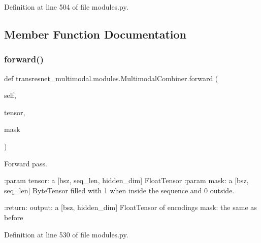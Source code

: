 Definition at line 504 of file modules.\+py.



\subsection{Member Function Documentation}
\mbox{\label{classtransresnet__multimodal_1_1modules_1_1MultimodalCombiner_a6967efeaad96c86a9993b959a3c7c713}} 
\subsubsection{\texorpdfstring{forward()}{forward()}}
{\footnotesize\ttfamily def transresnet\+\_\+multimodal.\+modules.\+Multimodal\+Combiner.\+forward (\begin{DoxyParamCaption}\item[{}]{self,  }\item[{}]{tensor,  }\item[{}]{mask }\end{DoxyParamCaption})}

\begin{DoxyVerb}Forward pass.

:param tensor:
    a [bsz, seq_len, hidden_dim] FloatTensor
:param mask:
    a [bsz, seq_len] ByteTensor filled with 1 when inside the sequence and 0 outside.

:return:
    output: a [bsz, hidden_dim] FloatTensor of encodings
    mask: the same as before
\end{DoxyVerb}
 

Definition at line 530 of file modules.\+py.



